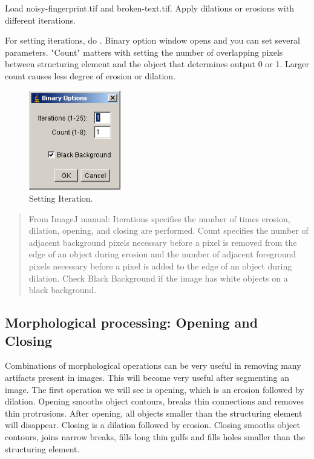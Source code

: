 \begin{indentexercise}{1}
Load noisy-fingerprint.tif and broken-text.tif. Apply dilations or
erosions with different iterations. 

For setting iterations, do . 
Binary option window opens and you can set
several parameters. "Count"
matters with setting the number of overlapping pixels between
structuring element and the object that determines output 0 or 1.
Larger count causes less degree of erosion or dilation.

\begin{figure}[htbp]
\begin{center}
\includegraphics[width=4cm]{fig/CMCIBasicCourse201102-img67.png}
\caption{ Setting Iteration.}
\label{fig:img67}
\end{center}
\end{figure}
\end{indentexercise}

\begin{quote}
From ImageJ manual: Iterations specifies the number of times erosion,
dilation, opening, and closing are performed. Count specifies the
number of adjacent background pixels necessary before a pixel is
removed from the edge of an object during erosion and the number of
adjacent foreground pixels necessary before a pixel is added to the
edge of an object during dilation. Check Black Background if the image
has white objects on a black background.
\end{quote}

\subsection{Morphological processing: Opening and Closing}

Combinations of morphological operations can be very useful in removing
many artifacts present in images. This will become very useful after
segmenting an image. The first operation we will see is opening, which
is an erosion followed by dilation. Opening smooths object contours,
breaks thin connections and removes thin protrusions. After opening,
all objects smaller than the structuring element will disappear.
Closing is a dilation followed by erosion. Closing smooths object
contours, joins narrow breaks, fills long thin gulfs and fills holes
smaller than the structuring element.

